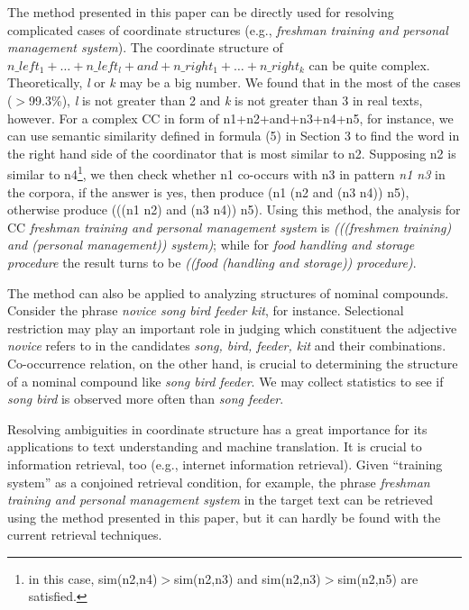 \hspace*{-5mm}{\bf Applications to Complex Coordinations and Nomial Compounds}
 \hspace*{4mm}The method presented in this paper can
be directly used for resolving complicated cases of coordinate structures (e.g., 
{\it freshman training and personal management system}). 
The coordinate structure 
of $n\_left_{1}+\dots+n\_left_{l}+and+n\_right_{1}+\ldots+n\_right_{k}$ can be quite complex. 
Theoretically, {\it l} or {\it k} may be a big number.
We found that in the most of the cases ($>$99.3\%), {\it l} 
is not greater than 2 and {\it k} is not greater than 3 in real texts, however. 
For a complex CC in form of n1+n2+and+n3+n4+n5, for
instance, we can use semantic similarity defined in formula (5)
 in Section 3 to 
find the word in the right hand side of the coordinator 
that is most similar to n2. Supposing n2 is similar 
to n4\footnote{in this case, sim(n2,n4)$>$sim(n2,n3) and sim(n2,n3)$>$sim(n2,n5) are
satisfied.}, 
we then check whether n1 co-occurs with n3 in pattern {\it n1 n3} in the corpora, 
if the answer is yes, then produce (n1 (n2 and (n3 n4)) n5), otherwise produce
(((n1 n2) and (n3 n4)) n5). Using this method, the analysis for CC
{\it freshman training and personal management system} is 
{\it (((freshmen training) and (personal management)) system)}; while for 
{\it food handling and storage procedure} the result turns to be
{\it ((food (handling and storage)) procedure)}. 
 
The method can also be applied to analyzing structures 
of nominal compounds. Consider the phrase {\it novice song bird feeder kit}, for instance.
Selectional restriction may play an important role in judging which constituent the
 adjective {\it novice} refers to in
 the candidates {\it song, bird, feeder, kit} and their combinations. 
Co-occurrence relation, on the other hand, is crucial to determining the structure 
of a nominal compound like {\it song bird feeder}. We may collect statistics to see if 
{\it song bird} is observed more often than {\it song feeder}.

\vspace*{3mm}
\hspace*{-5mm}{\bf Conclusion} \hspace*{4mm}
Resolving ambiguities in coordinate structure has a great importance for its applications
to text understanding and machine translation. It is crucial to information
retrieval, too (e.g., internet information retrieval).  
Given ``training system'' as a conjoined retrieval condition, for example, the phrase {\it
freshman training and personal management system} in the target text can be 
retrieved using the method presented in this paper, but it can hardly be found with
the current retrieval techniques.

